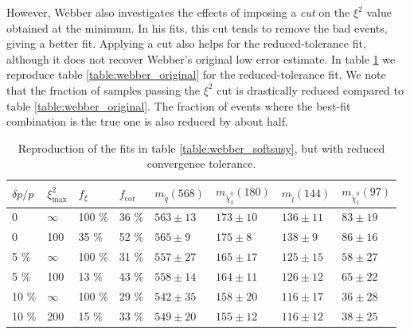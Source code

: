 \documentclass[twoside,english]{uiofysmaster}
\begin{document}


However, Webber also investigates the effects of imposing a {\it cut} on the $\xi^2$ value obtained at the minimum. In his fits, this cut tends to remove the bad events, giving a better fit. Applying a cut also helps for the reduced-tolerance fit, although it does not recover Webber's original low error estimate. In table \ref{table:webber_rec_lowtol} we reproduce table \ref{table:webber_original} for the reduced-tolerance fit. We note that the fraction of samples passing the $\xi^2$ cut is drastically reduced compared to table \ref{table:webber_original}. The fraction of events where the best-fit combination is the true one is also reduced by about half. 

\begin{table}[hbt]
	\centering
	\begin{tabular}{| l | l | l | l  || l | l | l | l |}
		\hline
		$\delta p/p$ & $\xi^2_\mathrm{max}$ & $f_\xi$ & $f_\mathrm{cor}$ & $m_{\tilde q} (568)$ & $m_{\tilde \chi_2^0} (180)$ & $m_{\tilde l} (144)$ & $m_{\tilde \chi_1^0} (97)$ \\
		\hline \hline
		0 & 	$\infty$ &	100 \%	& 36 \%	& $563 \pm 13$	&	$173 \pm 10$	&	$136 \pm 11$	& 	$83 \pm 19$	\\
		0 &		100 &		35 \%	& 52 \% & $565 \pm 9$	&	$175 \pm 8$		&	$138 \pm 9$	&	$86 \pm 16$	\\
		5 \% &	$\infty$ &	100 \%	& 31 \% & $557 \pm 27$	& 	$165 \pm 17$	&	$125 \pm 15$&	$58 \pm 27$ \\
		5 \% &	100 &		13 \%	& 43 \% & $558 \pm 14$	&	$164 \pm 11$	& 	$126 \pm 12$	&	$65 \pm 22$	\\
		10 \% &	$\infty$ &	100 \%	& 29 \% & $542 \pm 35$	&	$158 \pm 20$	&	$116 \pm 17$&	$36 \pm 28$	\\
		10 \% &	200 &		15 \%	& 33 \% & $549 \pm 20$	& 	$155 \pm 12$	&	$116 \pm 12$&	$38 \pm 25$ \\
		\hline
	\end{tabular}
	\caption{Reproduction of the fits in table \ref{table:webber_softsusy}, but with reduced convergence tolerance.}
	\label{table:webber_rec_lowtol}
\end{table}
\end{document}
